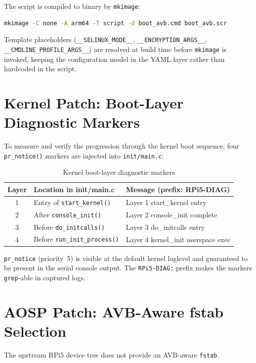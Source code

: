 The script is compiled to binary by \texttt{mkimage}:
\begin{lstlisting}[language=bash]
mkimage -C none -A arm64 -T script -d boot_avb.cmd boot_avb.scr
\end{lstlisting}

Template placeholders (\texttt{\_\_SELINUX\_MODE\_\_}, \texttt{\_\_ENCRYPTION\_ARGS\_\_}, \texttt{\_\_CMDLINE\_PROFILE\_ARGS\_\_}) are resolved at build time before \texttt{mkimage} is invoked, keeping the configuration model in the YAML layer rather than hardcoded in the script.

\section{Kernel Patch: Boot-Layer Diagnostic Markers}
\label{sec:impl_kernel_patch}

To measure and verify the progression through the kernel boot sequence, four \texttt{pr\_notice()} markers are injected into \texttt{init/main.c}:

\begin{table}[h]
\centering
\caption{Kernel boot-layer diagnostic markers}
\label{tab:kernel_diag}
\begin{tabular}{cll}
\toprule
\textbf{Layer} & \textbf{Location in init/main.c} & \textbf{Message (prefix: RPi5-DIAG)} \\
\midrule
1 & Entry of \texttt{start\_kernel()} & Layer 1 start\_kernel entry \\
2 & After \texttt{console\_init()} & Layer 2 console\_init complete \\
3 & Before \texttt{do\_initcalls()} & Layer 3 do\_initcalls entry \\
4 & Before \texttt{run\_init\_process()} & Layer 4 kernel\_init userspace exec \\
\bottomrule
\end{tabular}
\end{table}

\texttt{pr\_notice} (priority~5) is visible at the default kernel loglevel and guaranteed to be present in the serial console output. The \texttt{RPi5-DIAG:} prefix makes the markers \texttt{grep}-able in captured logs.

\section{AOSP Patch: AVB-Aware fstab Selection}
\label{sec:impl_avb_fstab}

The upstream RPi5 device tree does not provide an AVB-aware \texttt{fstab}.

